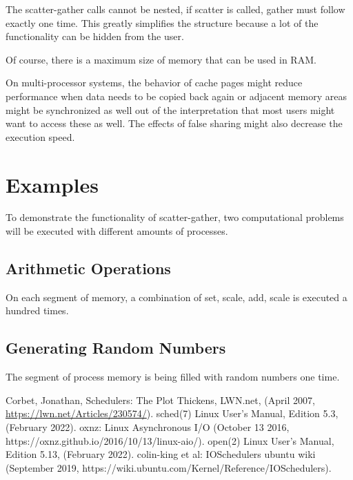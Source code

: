 \documentclass[a4paper]{article}
\begin{document}
The scatter-gather calls cannot be nested, if scatter is called, gather must follow exactly one time. This greatly simplifies the structure because a lot of the functionality can be hidden from the user. 

Of course, there is a maximum size of memory that can be used in RAM.

On multi-processor systems, the behavior of cache pages might reduce performance when data needs to be copied back again or adjacent memory areas might be synchronized as well out of the interpretation that most users might want to access these as well. The effects of false sharing might also decrease the execution speed.

\section{Examples}

To demonstrate the functionality of scatter-gather, two computational problems will be executed with different amounts of processes. 

\subsection{Arithmetic Operations}
On each segment of memory, a combination of set, scale, add, scale is executed a hundred times. 

\subsection{Generating Random Numbers}
The segment of process memory is being filled with random numbers one time.



\begin{thebibliography}{99}
	 Corbet, Jonathan, Schedulers: The Plot Thickens, LWN.net, (April 2007, \href{https://lwn.net/Articles/230574/}{https://lwn.net/Articles/230574/}).
	 sched(7) Linux User's Manual, Edition 5.3, (February 2022).
     oxnz: Linux Asynchronous I/O (October 13 2016, https://oxnz.github.io/2016/10/13/linux-aio/).
     open(2) Linux User's Manual, Edition 5.13, (February 2022).
     colin-king et al: IOSchedulers ubuntu wiki (September 2019, https://wiki.ubuntu.com/Kernel/Reference/IOSchedulers).
\end{thebibliography}
\end{document}

